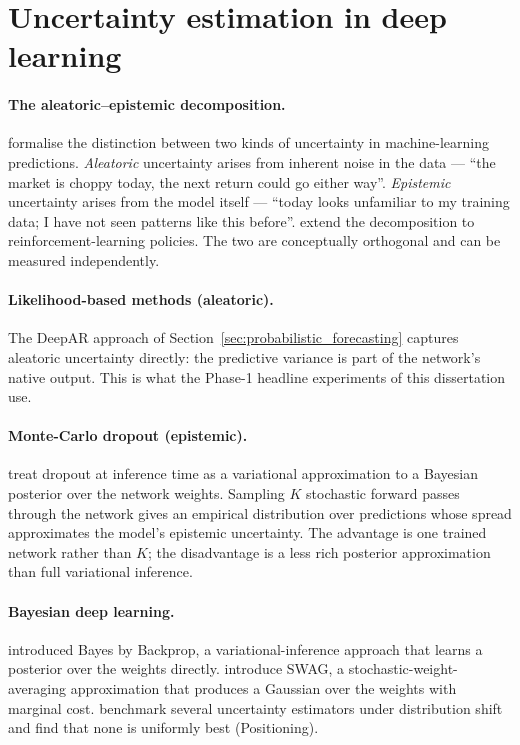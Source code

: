 \section{Uncertainty estimation in deep learning}
\label{sec:uncertainty_estimation}

\paragraph{The aleatoric--epistemic decomposition.} \textcite{kendall2017uncertainties} formalise the distinction between two kinds of uncertainty in machine-learning predictions. \emph{Aleatoric} uncertainty arises from inherent noise in the data --- ``the market is choppy today, the next return could go either way''. \emph{Epistemic} uncertainty arises from the model itself --- ``today looks unfamiliar to my training data; I have not seen patterns like this before''. \textcite{depeweg2018decomposition} extend the decomposition to reinforcement-learning policies. The two are conceptually orthogonal and can be measured independently.

\paragraph{Likelihood-based methods (aleatoric).} The DeepAR approach of Section~\ref{sec:probabilistic_forecasting} captures aleatoric uncertainty directly: the predictive variance is part of the network's native output. This is what the Phase-1 headline experiments of this dissertation use.

\paragraph{Monte-Carlo dropout (epistemic).} \textcite{gal2016dropout} treat dropout at inference time as a variational approximation to a Bayesian posterior over the network weights. Sampling $K$ stochastic forward passes through the network gives an empirical distribution over predictions whose spread approximates the model's epistemic uncertainty. The advantage is one trained network rather than $K$; the disadvantage is a less rich posterior approximation than full variational inference.

\paragraph{Bayesian deep learning.} \textcite{blundell2015weight} introduced Bayes by Backprop, a variational-inference approach that learns a posterior over the weights directly. \textcite{maddox2019simple} introduce SWAG, a stochastic-weight-averaging approximation that produces a Gaussian over the weights with marginal cost. \textcite{ovadia2019can} benchmark several uncertainty estimators under distribution shift and find that none is uniformly best (Positioning).

